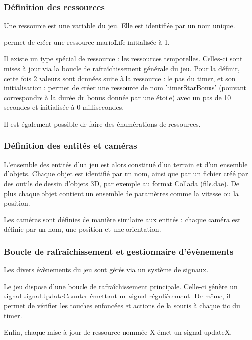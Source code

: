 \subsubsection{Définition des ressources}

Une ressource est une variable du jeu.
Elle est identifiée par un nom unique.

 permet de créer une ressource marioLife initialisée à 1.

Il existe un type spécial de ressource : les ressources temporelles.
Celles-ci sont mises à jour via la boucle de rafraîchissement générale du jeu.
Pour la définir, cette fois 2 valeurs sont données suite à la ressource : le pas du timer, et son initialisation :
 permet de créer une ressource de nom 'timerStarBonus' (pouvant correspondre à la durée du bonus donnée par une étoile)
avec un pas de 10 secondes et initialisée à 0 millisecondes. 

Il est également possible de faire des énumérations de ressources.

\subsubsection{Définition des entités et caméras}

L'ensemble des entités d'un jeu est alors constitué d'un terrain et d'un ensemble d'objets.
Chaque objet est identifié par un nom, ainsi que par un fichier créé par des outils de dessin d'objets 3D, par exemple au format Collada (file.dae).
De plus chaque objet contient un ensemble de paramètres comme la vitesse ou la position.

Les caméras sont définies de manière similaire aux entités : chaque caméra est définie par un nom, une position et une orientation.

\subsubsection{Boucle de rafraîchissement et gestionnaire d'évènements}

Les divers évènements du jeu sont gérés via un système de signaux.

Le jeu dispose d'une boucle de rafraîchissement principale. Celle-ci génère un signal
signalUpdateCounter émettant un signal régulièrement.
De même, il permet de vérifier les touches enfoncées et actions de la souris à chaque tic du timer.

Enfin, chaque mise à jour de ressource nommée X émet un signal updateX.

